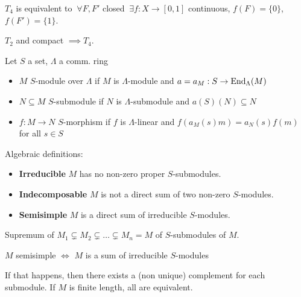 \begin{proposition} $T_4$ is equivalent to $\ \forall  F, F'$ closed $\ \exists f : X \to [0, 1]$ continuous, $f(F) = \{0\}$, $f(F') = \{1\}$.
\end{proposition}

\begin{proposition} $T_2$ and compact $\implies T_4$.
\end{proposition}

Let $S$ a set, $\Lambda$ a comm. ring
\begin{definition} 
\begin{itemize}[topsep=-6pt, itemsep=0pt]
    \item $M$ $S$-module over $\Lambda$ if $M$ is $\Lambda$-module and $a = a_M : S \to \operatorname{End}_{\Lambda}(M)$ 
    \item $N \subseteq M$ $S$-submodule if $N$ is $\Lambda$-submodule and $a(S)(N) \subseteq N$
    \item $f :M \to N$ $S$-morphism if $f$ is $\Lambda$-linear and $f(a_M(s)m) = a_N(s) f(m)$ for all $s \in S$
\end{itemize}
\end{definition}

\begin{definition} Algebraic definitions:
\begin{itemize}[topsep=-6pt, itemsep=0pt]
    \item \textbf{Irreducible} $M$ has no non-zero proper $S$-submodules.
    \item \textbf{Indecomposable} $M$ is not a direct sum of two non-zero $S$-modules.
    \item \textbf{Semisimple} $M$ is a direct sum of irreducible $S$-modules.
\end{itemize}
\end{definition}

\begin{definition}[Length] Supremum of $M_1 \subsetneq M_2 \subsetneq \dots \subsetneq M_n = M$ of $S$-submodules of $M$.
\end{definition}

\begin{proposition} $M$ semisimple $\iff$ $M$ is a sum of irreducible $S$-modules

If that happens, then there exists a (non unique) complement for each submodule. If $M$ is finite length, all are equivalent.
\end{proposition}

